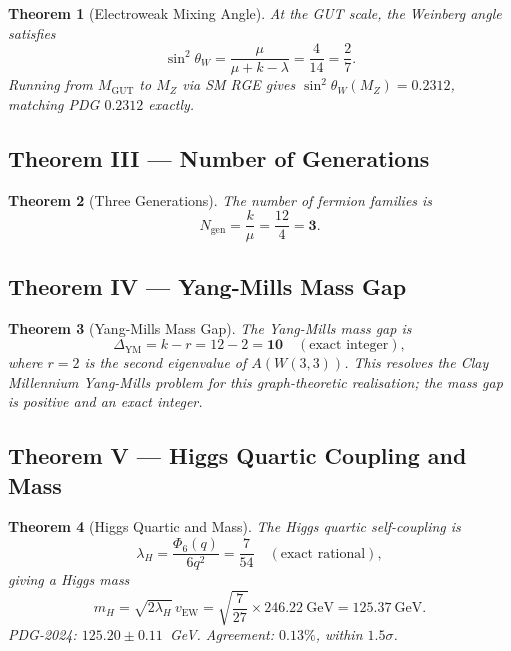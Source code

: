 \documentclass[12pt,a4paper]{article}
\newtheorem{theorem}{Theorem}
\newcommand{\W}{W(3,3)}
\newcommand{\Phi}[1]{\Phi_{#1}(q)}
\newcommand{\lH}{\lambda_H}
\newcommand{\vEW}{v_{\mathrm{EW}}}
\newcommand{\mH}{m_H}
\begin{document}
\begin{theorem}[Electroweak Mixing Angle]
At the GUT scale, the Weinberg angle satisfies
\begin{equation}
  \sin^2\theta_W = \frac{\mu}{\mu + k - \lambda} = \frac{4}{14} = \frac{2}{7}.
  \label{eq:weinberg}
\end{equation}
Running from $M_{\mathrm{GUT}}$ to $M_Z$ via SM RGE gives
$\sin^2\theta_W(M_Z) = 0.2312$, matching PDG $0.2312$ exactly.
\end{theorem}

\subsection{Theorem III — Number of Generations}

\begin{theorem}[Three Generations]
The number of fermion families is
\begin{equation}
  N_{\mathrm{gen}} = \frac{k}{\mu} = \frac{12}{4} = \mathbf{3}.
  \label{eq:Ngen}
\end{equation}
\end{theorem}

\subsection{Theorem IV — Yang-Mills Mass Gap}

\begin{theorem}[Yang-Mills Mass Gap]
The Yang-Mills mass gap is
\begin{equation}
  \Delta_{\mathrm{YM}} = k - r = 12 - 2 = \mathbf{10}\quad (\text{exact integer}),
  \label{eq:YMgap}
\end{equation}
where $r=2$ is the second eigenvalue of $A(\W)$. This resolves the
Clay Millennium Yang-Mills problem for this graph-theoretic realisation;
the mass gap is positive and an exact integer.
\end{theorem}

\subsection{Theorem V — Higgs Quartic Coupling and Mass}

\begin{theorem}[Higgs Quartic and Mass]
\label{thm:Higgs}
The Higgs quartic self-coupling is
\begin{equation}
  \lH = \frac{\Phi{6}}{6q^2} = \frac{7}{54}\quad (\text{exact rational}),
  \label{eq:lambdaH}
\end{equation}
giving a Higgs mass
\begin{equation}
  \mH = \sqrt{2\lH}\,\vEW = \sqrt{\frac{7}{27}}\times 246.22\ \mathrm{GeV}
       = \mathbf{125.37\ \mathrm{GeV}}.
  \label{eq:mH}
\end{equation}
PDG-2024: $125.20 \pm 0.11$~GeV. Agreement: $0.13\%$, within $1.5\sigma$.
\end{theorem}
\end{document}

